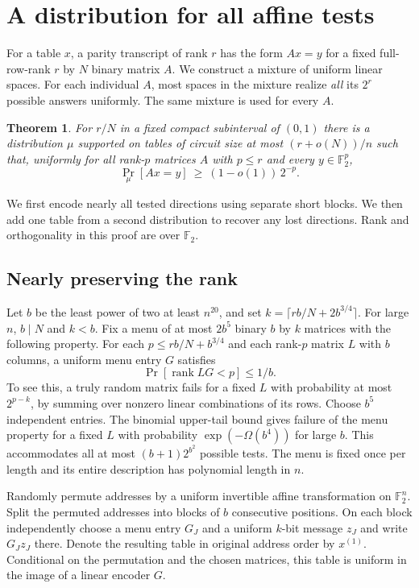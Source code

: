 \documentclass[11pt]{article}
\newtheorem{theorem}{Theorem}[section]
\newcommand{\F}{\mathbb F_2}
\newcommand{\rank}{\operatorname{rank}}
\begin{document}
\section{A distribution for all affine tests}
For a table $x$, a parity transcript of rank $r$ has the form $Ax=y$ for a fixed full-row-rank $r$ by $N$ binary matrix $A$. We construct a mixture of uniform linear spaces. For each individual $A$, most spaces in the mixture realize \emph{all} its $2^r$ possible answers uniformly. The same mixture is used for every $A$.

\begin{theorem}\label{th:law}
For $r/N$ in a fixed compact subinterval of $(0,1)$ there is a distribution $\mu$ supported on tables of circuit size at most $(r+o(N))/n$ such that, uniformly for all rank-$p$ matrices $A$ with $p\le r$ and every $y\in\F^p$,
\[
                   \Pr_\mu[Ax=y]\ \ge\ (1-o(1))\,2^{-p}.
\]
\end{theorem}
We first encode nearly all tested directions using separate short blocks. We then add one table from a second distribution to recover any lost directions. Rank and orthogonality in this proof are over $\F$.

\subsection{Nearly preserving the rank}
Let $b$ be the least power of two at least $n^{20}$, and set $k=\lceil rb/N+2b^{3/4}\rceil$. For large $n$, $b\mid N$ and $k<b$. Fix a menu of at most $2b^5$ binary $b$ by $k$ matrices with the following property. For each $p\le rb/N+b^{3/4}$ and each rank-$p$ matrix $L$ with $b$ columns, a uniform menu entry $G$ satisfies
\[
                        \Pr[\rank LG<p]\le 1/b .
\]
To see this, a truly random matrix fails for a fixed $L$ with probability at most $2^{p-k}$, by summing over nonzero linear combinations of its rows. Choose $b^5$ independent entries. The binomial upper-tail bound gives failure of the menu property for a fixed $L$ with probability $\exp(-\Omega(b^4))$ for large $b$. This accommodates all at most $(b+1)2^{b^2}$ possible tests. The menu is fixed once per length and its entire description has polynomial length in $n$.

Randomly permute addresses by a uniform invertible affine transformation on $\F^n$. Split the permuted addresses into blocks of $b$ consecutive positions. On each block independently choose a menu entry $G_J$ and a uniform $k$-bit message $z_J$ and write $G_Jz_J$ there. Denote the resulting table in original address order by $x^{(1)}$. Conditional on the permutation and the chosen matrices, this table is uniform in the image of a linear encoder $G$.
\end{document}
